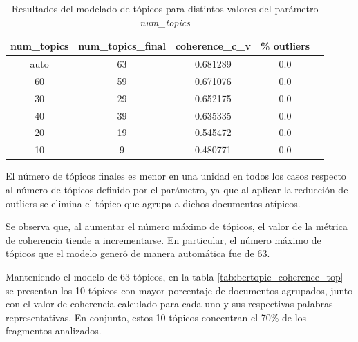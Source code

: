 \documentclass[11pt,a4paper]{article}
\begin{document}
		\begin{table}[H]
			\centering
			\begin{tabular}{ccccc}
				\hline
				\textbf{num\_topics} & \textbf{num\_topics\_final} & \textbf{coherence\_c\_v} & \textbf{\% outliers} \\
				\hline
				auto & 63 & 0.681289 & 0.0 \\
				60   & 59 & 0.671076 & 0.0 \\
				30   & 29 & 0.652175 & 0.0 \\
				40   & 39 & 0.635335 & 0.0 \\
				20   & 19 & 0.545472 & 0.0 \\
				10   & 9  & 0.480771 & 0.0 \\
				\hline
			\end{tabular}
			\caption{Resultados del modelado de tópicos para distintos valores del parámetro \textit{num\_topics}}
			\label{tab:coherence_topics}
		\end{table}
		
		El número de tópicos finales es menor en una unidad en todos los casos respecto al número de tópicos definido por el parámetro, ya que al aplicar la reducción de outliers se elimina el tópico que agrupa a dichos documentos atípicos.
		
		Se observa que, al aumentar el número máximo de tópicos, el valor de la métrica de coherencia tiende a incrementarse. En particular, el número máximo de tópicos que el modelo generó de manera automática fue de 63.
		
		Manteniendo el modelo de 63 tópicos, en la tabla \ref{tab:bertopic_coherence_top} se presentan los 10 tópicos con mayor porcentaje de documentos agrupados, junto con el valor de coherencia calculado para cada uno y sus respectivas palabras representativas. En conjunto, estos 10 tópicos concentran el 70\% de los fragmentos analizados.
		
\end{document}
